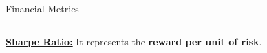 \documentclass[usenames,dvipsnames]{beamer} %
\begin{document}
\begin{frame}{Financial Metrics}




%
%
%

\begin{columns}
\begin{column}{.5\textwidth}
\textbf{\underline{Sharpe Ratio:}} It represents the \textbf{reward per unit 
of risk}.\\


\end{column}
\end{columns}
\end{frame}
\end{document}
